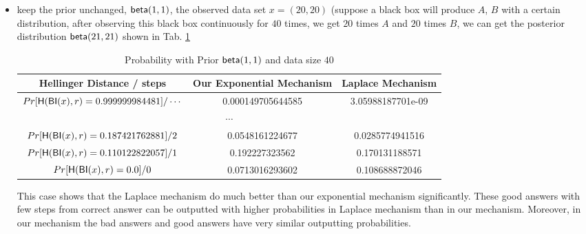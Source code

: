 \documentclass[sigconf, anonymous]{acmart}
\begin{document}
\begin{itemize}
\begin{itemize}
		\item keep the prior unchanged, $\mathsf{beta}(1,1)$, the observed data set $x = (20,20)$ (suppose a black box will produce $A$, $B$ with a certain distribution, after observing this black box continuously for $40$ times, we get $20$ times $A$ and $20$ times $B$, we can get the posterior distribution $\mathsf{beta}(21,21)$ shown in Tab. \ref{tab_40}

		\begin{center}
		\begin{table}
		 \begin{tabular}{c | c | c} 
		 \hline
		 Hellinger Distance / steps & Our Exponential Mechanism & Laplace Mechanism  \\
		 \hline\hline
		 $Pr[\mathsf{H}(\mathsf{BI}(x), r) = 0.999999984481] / \cdots 	$ & 0.000149705644585 & 3.05988187701e-09\\ 
		 \hline
		 \multicolumn{3}{c}{$\cdots$}  \\
		 \hline
		 $Pr[\mathsf{H}(\mathsf{BI}(x), r) = 0.187421762881] / 2		$ & 0.0548161224677 & 0.0285774941516 \\
		 \hline
		 $Pr[\mathsf{H}(\mathsf{BI}(x), r) = 0.110122822057 ] / 1		$ & 0.192227323562 & 0.170131188571  \\
		 \hline
		 $Pr[\mathsf{H}(\mathsf{BI}(x), r) = 0.0 ] / 0 					$ & 0.0713016293602 & 0.108688872046 \\
		 \hline
		\end{tabular}
		\caption{Probability with Prior $\mathsf{beta}(1,1)$ and data size $40$}
		\label{tab_40}
		\end{table}
		\end{center}

		This case shows that the Laplace mechanism do much better than our exponential mechanism significantly. These good answers with few steps from correct answer can be outputted with higher probabilities in Laplace mechanism than in our mechanism. Moreover, in our mechanism the bad answers and good answers have very similar outputting probabilities.



\end{itemize}
\end{itemize}
\end{document}
